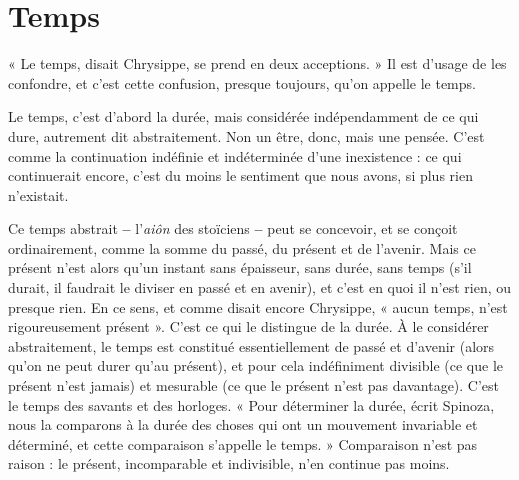 \section{Temps}
« Le temps, disait Chrysippe, se prend en deux acceptions. » Il est
d’usage de les confondre, et c’est cette confusion, presque toujours,
qu’on appelle le temps.

Le temps, c’est d’abord la durée, mais considérée indépendamment de ce
qui dure, autrement dit abstraitement. Non un être, donc, mais une pensée.
C’est comme la continuation indéfinie et indéterminée d’une inexistence : ce
qui continuerait encore, c’est du moins le sentiment que nous avons, si plus
rien n'existait.

Ce temps abstrait {\bf --} l’{\it aiôn} des stoïciens {\bf --} peut se concevoir, et se conçoit
ordinairement, comme la somme du passé, du présent et de l’avenir. Mais ce
présent n’est alors qu’un instant sans épaisseur, sans durée, sans temps (s’il
durait, il faudrait le diviser en passé et en avenir), et c’est en quoi il n’est rien,
ou presque rien. En ce sens, et comme disait encore Chrysippe, « aucun temps,
n’est rigoureusement présent ». C’est ce qui le distingue de la durée. À le considérer
abstraitement, le temps est constitué essentiellement de passé et d’avenir
(alors qu’on ne peut durer qu’au présent), et pour cela indéfiniment divisible
(ce que le présent n’est jamais) et mesurable (ce que le présent n’est pas davantage).
C’est le temps des savants et des horloges. « Pour déterminer la durée,
écrit Spinoza, nous la comparons à la durée des choses qui ont un mouvement
invariable et déterminé, et cette comparaison s’appelle le temps. » Comparaison
n’est pas raison : le présent, incomparable et indivisible, n’en continue pas
moins.

